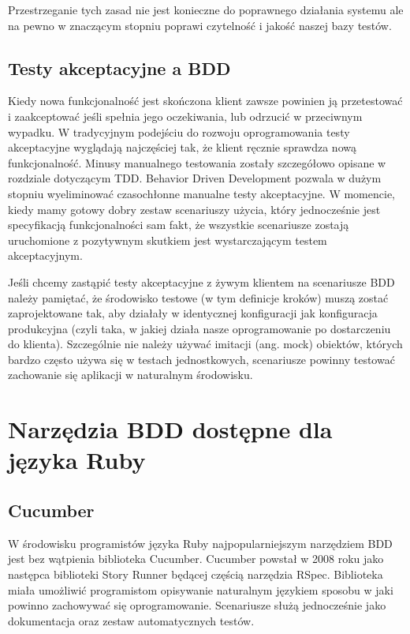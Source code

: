       Przestrzeganie tych zasad nie jest konieczne do poprawnego działania systemu ale na pewno w znaczącym stopniu poprawi czytelność i jakość naszej bazy testów.
      
    \subsection{Testy akceptacyjne a BDD}
      
      Kiedy nowa funkcjonalność jest skończona klient zawsze powinien ją przetestować i zaakceptować jeśli spełnia jego oczekiwania, lub odrzucić w przeciwnym wypadku. W tradycyjnym podejściu do rozwoju oprogramowania testy akceptacyjne wyglądają najczęściej tak, że klient ręcznie sprawdza nową funkcjonalność. Minusy manualnego testowania zostały szczegółowo opisane w rozdziale dotyczącym TDD. Behavior Driven Development pozwala w dużym stopniu wyeliminować czasochłonne manualne testy akceptacyjne. W momencie, kiedy mamy gotowy dobry zestaw scenariuszy użycia, który jednocześnie jest specyfikacją funkcjonalności sam fakt, że wszystkie scenariusze zostają uruchomione z pozytywnym skutkiem jest wystarczającym testem akceptacyjnym.
      
      Jeśli chcemy zastąpić testy akceptacyjne z żywym klientem na scenariusze BDD należy pamiętać, że środowisko testowe (w tym definicje kroków) muszą zostać zaprojektowane tak, aby działały w identycznej konfiguracji jak konfiguracja produkcyjna (czyli taka, w jakiej działa nasze oprogramowanie po dostarczeniu do klienta). Szczególnie nie należy używać imitacji (ang. mock) obiektów, których bardzo często używa się w testach jednostkowych, scenariusze powinny testować zachowanie się aplikacji w naturalnym środowisku.
      
  \section{Narzędzia BDD dostępne dla języka Ruby}
    \subsection{Cucumber}
      W środowisku programistów języka Ruby najpopularniejszym narzędziem BDD jest bez wątpienia biblioteka Cucumber. Cucumber powstał w 2008 roku jako następca biblioteki Story Runner będącej częścią narzędzia RSpec. Biblioteka miała umożliwić programistom opisywanie naturalnym językiem sposobu w jaki powinno zachowywać się oprogramowanie. Scenariusze służą jednocześnie jako dokumentacja oraz zestaw automatycznych testów. 
      
